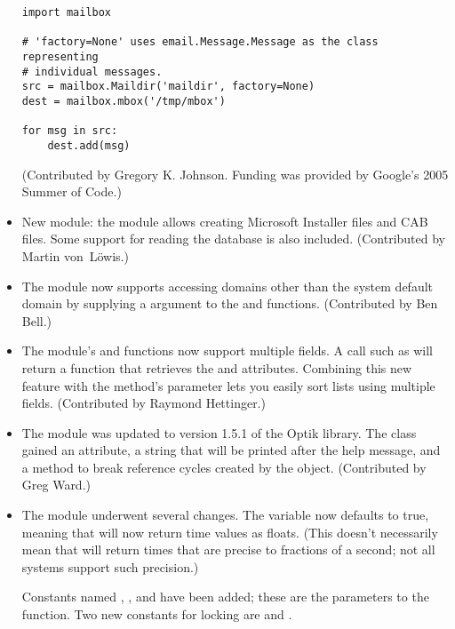 \documentclass{howto}
\begin{document}
\begin{itemize}
\begin{verbatim}
import mailbox

# 'factory=None' uses email.Message.Message as the class representing
# individual messages.
src = mailbox.Maildir('maildir', factory=None)
dest = mailbox.mbox('/tmp/mbox')

for msg in src:
    dest.add(msg)
\end{verbatim}

(Contributed by Gregory K. Johnson.  Funding was provided by Google's
2005 Summer of Code.)

\item New module: the  module allows creating
Microsoft Installer  files and CAB files.  Some support
for reading the  database is also included.
(Contributed by Martin von~L\"owis.)

\item The  module now supports accessing domains other
than the system default domain by supplying a  argument to
the  and  functions.
(Contributed by Ben Bell.)

\item The  module's  
and  functions now support multiple fields.  
A call such as 
will return a function 
that retrieves the  and  attributes.  Combining 
this new feature with the  method's  parameter 
lets you easily sort lists using multiple fields.
(Contributed by Raymond Hettinger.)

\item The  module was updated to version 1.5.1 of the
Optik library.  The  class gained an
 attribute, a string that will be printed after the
help message, and a  method to break reference
cycles created by the object. (Contributed by Greg Ward.)

\item The  module underwent several changes.  The
 variable now defaults to true, meaning that
 will now return time values as floats.  (This
doesn't necessarily mean that  will return times
that are precise to fractions of a second; not all systems support
such precision.)

Constants named , , and
 have been added; these are the parameters to the
 function.  Two new constants for locking are
 and .


\end{itemize}
\end{document}
